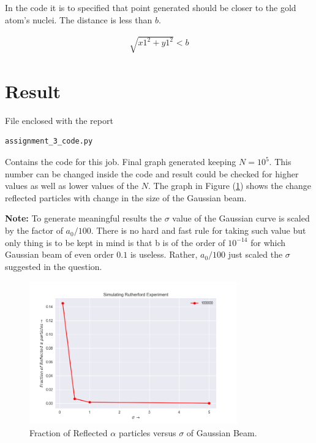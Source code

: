 \documentclass[11pt,a4paper]{article}
\begin{document}
In the code it is to specified that point generated should be closer to the gold atom's nuclei. The distance is less than $b$.

\begin{align*}
\sqrt{x1^2 + y1^2} < b
\end{align*}

\section{Result}
File enclosed with the report \begin{verbatim}
assignment_3_code.py
\end{verbatim}

\noindent Contains the code for this job. Final graph generated keeping $N=10^5$. This number can be changed inside the code and result could be checked for higher values as well as lower values of the $N$. The graph in Figure (\ref{fig_2}) shows the change reflected particles with change in the size of the Gaussian beam.\medskip

\noindent \textbf{Note: } To generate meaningful results the $\sigma$ value of the Gaussian curve is scaled by the factor of $a_0/100$. There is no hard and fast rule for taking such value but only thing is to be kept in mind is that b is of the order of $10^{-14}$ for which Gaussian beam of even order $0.1$ is useless. Rather, $a_0/100$ just scaled the $\sigma$ suggested in the question.

	\begin{figure}[H]
	\begin{center}
	\includegraphics[width=0.8\textwidth]{Figure_2.png}
	\caption{Fraction of Reflected $\alpha$ particles versus $\sigma$ of Gaussian Beam.}
	\label{fig_2}
	\end{center}
	\end{figure}
	
\end{document}
